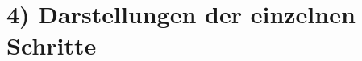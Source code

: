 \documentclass[11pt]{article}
\begin{document}
    \hypertarget{darstellungen-der-einzelnen-schritte}{%
\section*{4) Darstellungen der einzelnen
Schritte}\label{darstellungen-der-einzelnen-schritte}}

    \begin{center}
    \end{center}
    { \hspace*{\fill} \\}
    

    
    
    
    
\end{document}
